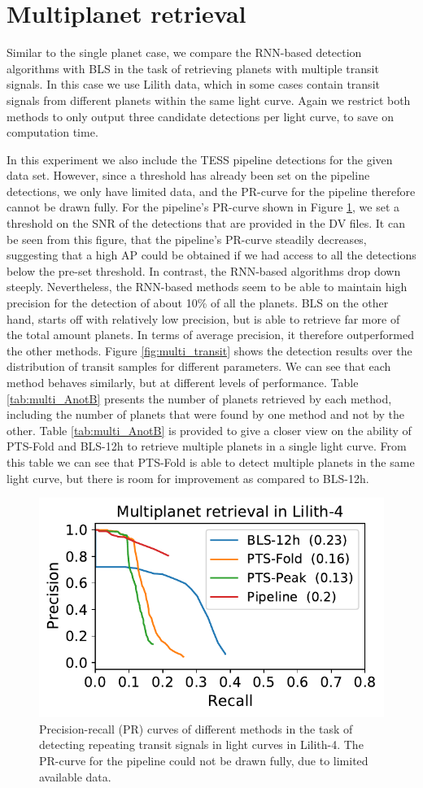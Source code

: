 
\section{Multiplanet retrieval}
\label{sec:multis}

Similar to the single planet case, we compare the RNN-based detection algorithms with BLS in the task of retrieving planets with multiple transit signals. In this case we use Lilith data, which in some cases contain transit signals from different planets within the same light curve. Again we restrict both methods to only output three candidate detections per light curve, to save on computation time.

In this experiment we also include the TESS pipeline detections for the given data set. However, since a threshold has already been set on the pipeline detections, we only have limited data, and the PR-curve for the pipeline therefore cannot be drawn fully. For the pipeline's PR-curve shown in Figure \ref{fig:multi_pr}, we set a threshold on the SNR of the detections that are provided in the DV files. It can be seen from this figure, that the pipeline's PR-curve steadily decreases, suggesting that a high AP could be obtained if we had access to all the detections below the pre-set threshold. In contrast, the RNN-based algorithms drop down steeply. Nevertheless, the RNN-based methods seem to be able to maintain high precision for the detection of about 10\% of all the planets. BLS on the other hand, starts off with relatively low precision, but is able to retrieve far more of the total amount planets. In terms of average precision, it therefore outperformed the other methods. Figure \ref{fig:multi_transit} shows the detection results over the distribution of transit samples for different parameters. We can see that each method behaves similarly, but at different levels of performance. Table \ref{tab:multi_AnotB} presents the number of planets retrieved by each method, including the number of planets that were found by one method and not by the other. Table \ref{tab:multi_AnotB} is provided to give a closer view on the ability of PTS-Fold and BLS-12h to retrieve multiple planets in a single light curve. From this table we can see that PTS-Fold is able to detect multiple planets in the same light curve, but there is room for improvement as compared to BLS-12h.

\begin{figure}
    \centering
    \includegraphics[width=0.35\linewidth]{Experiments/Figures/Multis/multi_pr.pdf}
    \caption{Precision-recall (PR) curves of different methods in the task of detecting repeating transit signals in light curves in Lilith-4. The PR-curve for the pipeline could not be drawn fully, due to limited available data.}
    \label{fig:multi_pr}
\end{figure}

